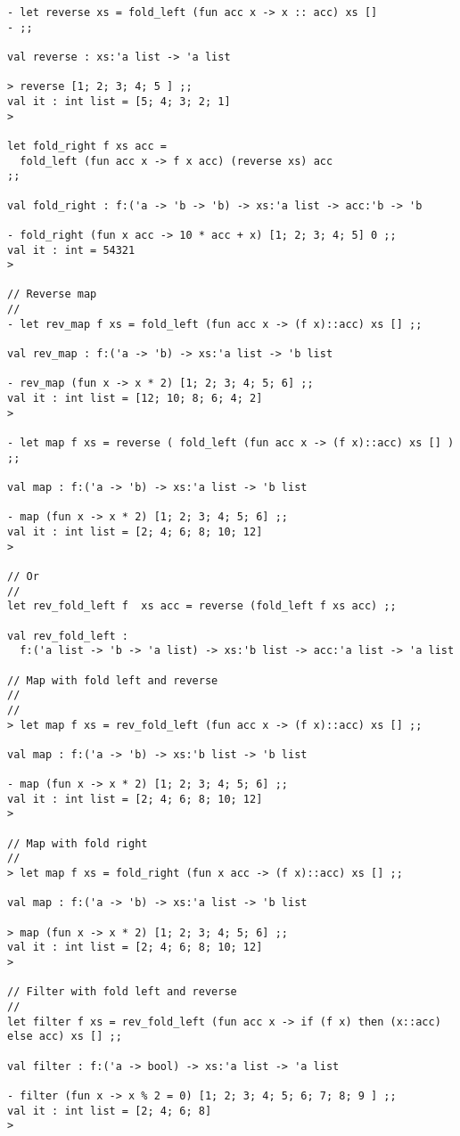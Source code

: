 \documentclass[11pt]{article}
\begin{document}
\begin{enumerate}
\begin{verbatim}
- let reverse xs = fold_left (fun acc x -> x :: acc) xs []
- ;;

val reverse : xs:'a list -> 'a list

> reverse [1; 2; 3; 4; 5 ] ;;
val it : int list = [5; 4; 3; 2; 1]
> 

let fold_right f xs acc =
  fold_left (fun acc x -> f x acc) (reverse xs) acc
;;
     
val fold_right : f:('a -> 'b -> 'b) -> xs:'a list -> acc:'b -> 'b

- fold_right (fun x acc -> 10 * acc + x) [1; 2; 3; 4; 5] 0 ;;
val it : int = 54321
> 

// Reverse map 
//
- let rev_map f xs = fold_left (fun acc x -> (f x)::acc) xs [] ;;  

val rev_map : f:('a -> 'b) -> xs:'a list -> 'b list

- rev_map (fun x -> x * 2) [1; 2; 3; 4; 5; 6] ;;
val it : int list = [12; 10; 8; 6; 4; 2]
> 

- let map f xs = reverse ( fold_left (fun acc x -> (f x)::acc) xs [] ) ;;

val map : f:('a -> 'b) -> xs:'a list -> 'b list

- map (fun x -> x * 2) [1; 2; 3; 4; 5; 6] ;;
val it : int list = [2; 4; 6; 8; 10; 12]
> 

// Or 
// 
let rev_fold_left f  xs acc = reverse (fold_left f xs acc) ;;

val rev_fold_left :
  f:('a list -> 'b -> 'a list) -> xs:'b list -> acc:'a list -> 'a list

// Map with fold left and reverse 
//
//
> let map f xs = rev_fold_left (fun acc x -> (f x)::acc) xs [] ;;

val map : f:('a -> 'b) -> xs:'b list -> 'b list

- map (fun x -> x * 2) [1; 2; 3; 4; 5; 6] ;;
val it : int list = [2; 4; 6; 8; 10; 12]
> 

// Map with fold right 
//
> let map f xs = fold_right (fun x acc -> (f x)::acc) xs [] ;;

val map : f:('a -> 'b) -> xs:'a list -> 'b list

> map (fun x -> x * 2) [1; 2; 3; 4; 5; 6] ;;
val it : int list = [2; 4; 6; 8; 10; 12]
> 

// Filter with fold left and reverse
//
let filter f xs = rev_fold_left (fun acc x -> if (f x) then (x::acc) else acc) xs [] ;;

val filter : f:('a -> bool) -> xs:'a list -> 'a list

- filter (fun x -> x % 2 = 0) [1; 2; 3; 4; 5; 6; 7; 8; 9 ] ;; 
val it : int list = [2; 4; 6; 8]
> 


\end{verbatim}
\end{enumerate}
\end{document}
